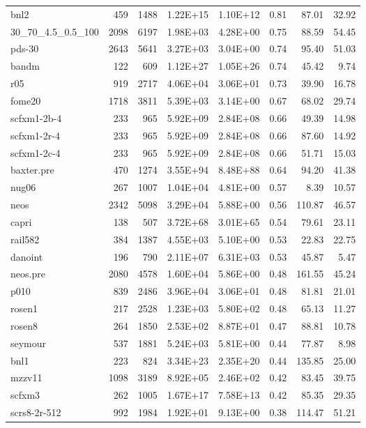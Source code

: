\documentclass[10pt]{article}
\begin{document}
\begin{longtable}{|l|r|r|r|r|r|r|r|}
bnl2	&	459	&	1488	&	1.22E+15	&	1.10E+12	&	0.81	&	87.01	&	32.92	\\
30\_70\_4.5\_0.5\_100	&	2098	&	6197	&	1.98E+03	&	4.28E+00	&	0.75	&	88.59	&	54.45	\\
pds-30	&	2643	&	5641	&	3.27E+03	&	3.04E+00	&	0.74	&	95.40	&	51.03	\\
bandm	&	122	&	609	&	1.12E+27	&	1.05E+26	&	0.74	&	45.42	&	9.74	\\
r05	&	919	&	2717	&	4.06E+04	&	3.06E+01	&	0.73	&	39.90	&	16.78	\\
fome20	&	1718	&	3811	&	5.39E+03	&	3.14E+00	&	0.67	&	68.02	&	29.74	\\
scfxm1-2b-4	&	233	&	965	&	5.92E+09	&	2.84E+08	&	0.66	&	49.39	&	14.98	\\
scfxm1-2r-4	&	233	&	965	&	5.92E+09	&	2.84E+08	&	0.66	&	87.60	&	14.92	\\
scfxm1-2c-4	&	233	&	965	&	5.92E+09	&	2.84E+08	&	0.66	&	51.71	&	15.03	\\
baxter.pre	&	470	&	1274	&	3.55E+94	&	8.48E+88	&	0.64	&	94.20	&	41.38	\\
nug06	&	267	&	1007	&	1.04E+04	&	4.81E+00	&	0.57	&	8.39	&	10.57	\\
neos	&	2342	&	5098	&	3.29E+04	&	5.88E+00	&	0.56	&	110.87	&	46.57	\\
capri	&	138	&	507	&	3.72E+68	&	3.01E+65	&	0.54	&	79.61	&	23.11	\\
rail582	&	384	&	1387	&	4.55E+03	&	5.10E+00	&	0.53	&	22.83	&	22.75	\\
danoint	&	196	&	790	&	2.11E+07	&	6.31E+03	&	0.53	&	45.87	&	5.47	\\
neos.pre	&	2080	&	4578	&	1.60E+04	&	5.86E+00	&	0.48	&	161.55	&	45.24	\\
p010	&	839	&	2486	&	3.96E+04	&	3.06E+01	&	0.48	&	81.81	&	21.01	\\
rosen1	&	217	&	2528	&	1.23E+03	&	5.80E+02	&	0.48	&	65.13	&	11.27	\\
rosen8	&	264	&	1850	&	2.53E+02	&	8.87E+01	&	0.47	&	88.81	&	10.78	\\
seymour	&	537	&	1881	&	5.24E+03	&	5.81E+00	&	0.44	&	77.87	&	8.98	\\
bnl1	&	223	&	824	&	3.34E+23	&	2.35E+20	&	0.44	&	135.85	&	25.00	\\
mzzv11	&	1098	&	3189	&	8.92E+05	&	2.46E+02	&	0.42	&	83.45	&	39.75	\\
scfxm3	&	262	&	1005	&	1.67E+17	&	7.58E+13	&	0.42	&	85.35	&	29.35	\\
scrs8-2r-512	&	992	&	1984	&	1.92E+01	&	9.13E+00	&	0.38	&	114.47	&	51.21	\\

\end{longtable}
\end{document}
